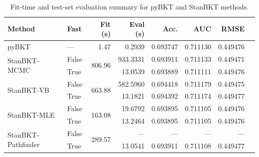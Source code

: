 
\begin{table}[t]
\centering
\caption{Fit-time and test-set evaluation summary for pyBKT and StanBKT methods.}
\label{tab:fit-eval-summary}
\begin{tabular}{llrrrrrr}
\toprule
Method & Fast & Fit (s) & Eval (s) & Acc. & AUC & RMSE \\
\midrule
pyBKT & --- & 1.47 & 0.2939 & 0.693747 & 0.711130 & 0.449476 \\
\midrule
\multirow{2}{*}{StanBKT-MCMC}       & False & \multirow{2}{*}{806.96} & 933.3331 & 0.693911 & 0.711133 & 0.449471 \\
                                     & True  &                         &  13.0539 & 0.693889 & 0.711111 & 0.449476 \\
\midrule
\multirow{2}{*}{StanBKT-VB}         & False & \multirow{2}{*}{663.88} & 582.5960 & 0.694418 & 0.711179 & 0.449475 \\
                                     & True  &                         &  13.1821 & 0.694392 & 0.711174 & 0.449477 \\
\midrule
\multirow{2}{*}{StanBKT-MLE}        & False & \multirow{2}{*}{163.08} &  19.6792 & 0.693895 & 0.711105 & 0.449476 \\
                                     & True  &                         &  13.2464 & 0.693895 & 0.711105 & 0.449476 \\
\midrule
\multirow{2}{*}{StanBKT-Pathfinder} & False & \multirow{2}{*}{289.57} & ---      & ---      & ---      & ---      \\
                                     & True  &                         &  13.0541 & 0.693911 & 0.711108 & 0.449477 \\
\bottomrule
\end{tabular}
\end{table}
